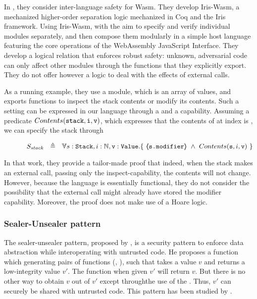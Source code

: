 %
In \cite{irisWasm23}, they consider inter-language safety for Wasm. They develop Iris-Wasm, a mechanized higher-order separation logic mechanized in Coq and the Iris framework. Using Iris-Wasm, with the aim to
specify and verify individual modules separately, and then compose them modularly in a simple host language
featuring the core operations of the WebAssembly JavaScript Interface. They develop a 
logical relation that enforces robust safety: unknown, adversarial code can only aﬀect other modules through
the functions that they explicitly export. 
They do not offer however a logic to deal with the effects of external calls.

As a running example, they use a  module, which is an array of values, and exports functions to inspect the stack contents or modify its contents. 
Such a setting can be expressed in our language through a  and a  capability.
Assuming a predicate $Contents(\mbox{\normalfont{\texttt{stack}}},\mbox{\normalfont{\texttt{i}}},\mbox{\normalfont{\texttt{v}}})$, which expresses that the contents of  at index  is , we can specify the stack through
 
 $$\strut \SPSP  S_{stack}\ \  \triangleq \ \ \TwoStatesN{ s:\prg{Stack},i:\mathbb{N},\prg{v}:\prg{Value}} 
 {\ \inside{\prg{s.modifier}} \ \wedge \ Contents(\prg{s},i,\prg{v})\  }$$  
 
 
 
 In that work, they provide a tailor-made proof that indeed, when the stack makes an external call, passing only the inspect-capability, the contents will not change. 
 However, because the language is essentially functional, they do not consider the possibility that the external call might already have stored the modifier capability.
 Moreover, the proof does not make use of a Hoare logic.  
 
 \subsubsection{Sealer-Unsealer pattern} 
 The sealer-unsealer pattern, proposed by \citet{JamesMorris}, is a security  pattern  to enforce data
abstraction while interoperating with untrusted  code. He proposes a function
 which generating pairs of functions (,  ), such that  takes a value $v$ and returns a low-integrity value $v'$.
The function  when given $v'$ will return $v$. But there is no other way to obtain $v$ out of $v'$ except throughthe use of the .
Thus, $v'$ can securely be shared with untrusted code.
This pattern has been studied by \citet{ddd}.

